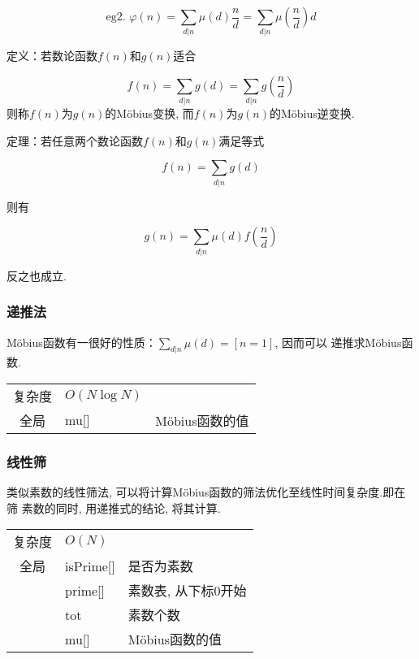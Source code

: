 \begin{equation}
\text{eg2.\ }\varphi (n) = \sum\limits_{d|n} \mu (d) \frac{n}{d} = \sum\limits_{d|n} \mu (\frac{n}{d}) d
\end{equation}

定义：若数论函数$f(n)$和$g(n)$适合

\begin{equation}
f(n) = \sum\limits_{d|n} g(d) = \sum\limits_{d|n} g(\frac{n}{d})
\end{equation}
则称$f(n)$为$g(n)$的M\"{o}bius变换, 而$f(n)$为$g(n)$的M\"{o}bius逆变换.


定理：若任意两个数论函数$f(n)$和$g(n)$满足等式

\begin{equation}
f(n) = \sum\limits_{d|n} g(d)
\end{equation}

则有

\begin{equation}
g(n) = \sum\limits_{d|n} \mu (d) f(\frac{n}{d})
\end{equation}

反之也成立.


        \subsubsection{递推法}\small
M\"{o}bius函数有一很好的性质：$\sum\limits_{d|n} \mu (d) = [n = 1]$, 因而可以
递推求M\"{o}bius函数.

\begin{longtable}{|c|l|l|}
复杂度 & $O(N\log N)$ &  \\
全局 & mu[] & M\"{o}bius函数的值 \\ 
\end{longtable}



        \subsubsection{线性筛}\small
类似素数的线性筛法, 可以将计算M\"{o}bius函数的筛法优化至线性时间复杂度.即在筛
素数的同时, 用递推式的结论, 将其计算.

\begin{longtable}{|c|l|l|}
复杂度 & $O(N)$ &  \\
全局 & isPrime[] & 是否为素数 \\
 & prime[] & 素数表, 从下标0开始 \\
 & tot & 素数个数 \\
 & mu[] & M\"{o}bius函数的值 \\ 
\end{longtable}



